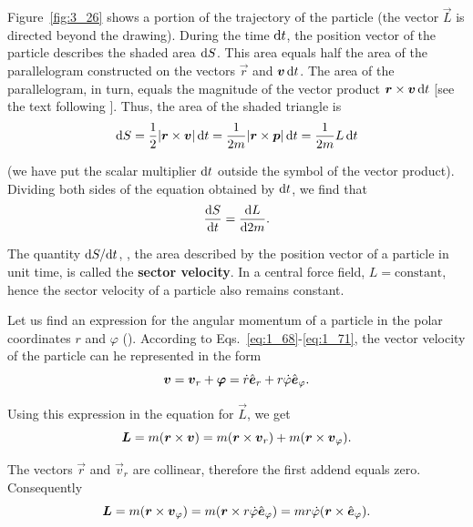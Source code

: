 Figure~\ref{fig:3_26} shows a portion of the trajectory of the particle (the vector $\vec{L}$ is directed beyond the drawing). During the time $\mathrm{d} t$, the position vector of the particle describes the shaded area $\mathrm{d} S$. This area equals half the area of the parallelogram constructed on the vectors $\vec{r}$ and $\boldsymbol{v}\,\mathrm{d} t$. The area of the parallelogram, in turn, equals the magnitude of the vector product $\boldsymbol{r}\times\boldsymbol{v}\,\mathrm{d} t$ [see the text following ]. Thus, the area of the shaded triangle is
\begin{equation*}
\mathrm{d} S = \frac{1}{2}|\boldsymbol{r}\times\boldsymbol{v}|\,\mathrm{d} t = \frac{1}{2m}|\boldsymbol{r}\times\boldsymbol{p}|\,\mathrm{d} t = \frac{1}{2m}L\,\mathrm{d} t
\end{equation*}

\noindent
(we have put the scalar multiplier $\mathrm{d} t$ outside the symbol of the vector product). Dividing both sides of the equation obtained by $\mathrm{d} t$, we find that
\begin{equation}\label{eq:3_121}
\frac{\mathrm{d} S}{\mathrm{d} t} = \frac{\mathrm{d} L}{\mathrm{d}2m}.
\end{equation}

The quantity $\mathrm{d} S/\mathrm{d} t$, \ie, the area described by the position vector of a particle in unit time, is called the \textbf{sector velocity}. In a central force field, $L=\text{constant}$, hence the sector velocity of a particle also remains constant.

Let us find an expression for the angular momentum of a particle in the polar coordinates $r$ and $\varphi$ (). According to Eqs.~\eqref{eq:1_68}-\eqref{eq:1_71}, the vector velocity of the particle can he represented in the form
\begin{equation}\label{eq:3_122}
\boldsymbol{v} = \boldsymbol{v}_r + \boldsymbol{\varphi} = \dot{r}\hat{\boldsymbol{e}}_{r} + r\dot{\varphi}\hat{\boldsymbol{e}}_{\varphi}.
\end{equation}

\noindent
Using this expression in the equation for $\vec{L}$, we get
\begin{equation*}
\boldsymbol{L} = m(\boldsymbol{r}\times\boldsymbol{v}) = m(\boldsymbol{r}\times\boldsymbol{v}_r) + m(\boldsymbol{r}\times\boldsymbol{v}_{\varphi}).
\end{equation*}

\noindent
The vectors $\vec{r}$ and $\vec{v}_r$ are collinear, therefore the first addend equals zero. Consequently
\begin{equation*}
\boldsymbol{L} = m(\boldsymbol{r}\times\boldsymbol{v}_{\varphi}) = m(\boldsymbol{r}\times r\dot{\varphi}\hat{\boldsymbol{e}}_{\varphi}) = mr\dot{\varphi}(\boldsymbol{r}\times\hat{\boldsymbol{e}}_{\varphi}).
\end{equation*}

